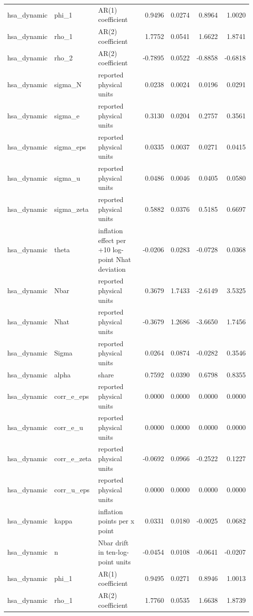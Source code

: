 \begin{tabular}{lllrrrr}
hsa\_dynamic & phi\_1 & AR(1) coefficient & 0.9496 & 0.0274 & 0.8964 & 1.0020 \\
hsa\_dynamic & rho\_1 & AR(2) coefficient & 1.7752 & 0.0541 & 1.6622 & 1.8741 \\
hsa\_dynamic & rho\_2 & AR(2) coefficient & -0.7895 & 0.0522 & -0.8858 & -0.6818 \\
hsa\_dynamic & sigma\_N & reported physical units & 0.0238 & 0.0024 & 0.0196 & 0.0291 \\
hsa\_dynamic & sigma\_e & reported physical units & 0.3130 & 0.0204 & 0.2757 & 0.3561 \\
hsa\_dynamic & sigma\_eps & reported physical units & 0.0335 & 0.0037 & 0.0271 & 0.0415 \\
hsa\_dynamic & sigma\_u & reported physical units & 0.0486 & 0.0046 & 0.0405 & 0.0580 \\
hsa\_dynamic & sigma\_zeta & reported physical units & 0.5882 & 0.0376 & 0.5185 & 0.6697 \\
hsa\_dynamic & theta & inflation effect per +10 log-point Nhat deviation & -0.0206 & 0.0283 & -0.0728 & 0.0368 \\
hsa\_dynamic & Nbar & reported physical units & 0.3679 & 1.7433 & -2.6149 & 3.5325 \\
hsa\_dynamic & Nhat & reported physical units & -0.3679 & 1.2686 & -3.6650 & 1.7456 \\
hsa\_dynamic & Sigma & reported physical units & 0.0264 & 0.0874 & -0.0282 & 0.3546 \\
hsa\_dynamic & alpha & share & 0.7592 & 0.0390 & 0.6798 & 0.8355 \\
hsa\_dynamic & corr\_e\_eps & reported physical units & 0.0000 & 0.0000 & 0.0000 & 0.0000 \\
hsa\_dynamic & corr\_e\_u & reported physical units & 0.0000 & 0.0000 & 0.0000 & 0.0000 \\
hsa\_dynamic & corr\_e\_zeta & reported physical units & -0.0692 & 0.0966 & -0.2522 & 0.1227 \\
hsa\_dynamic & corr\_u\_eps & reported physical units & 0.0000 & 0.0000 & 0.0000 & 0.0000 \\
hsa\_dynamic & kappa & inflation points per x point & 0.0331 & 0.0180 & -0.0025 & 0.0682 \\
hsa\_dynamic & n & Nbar drift in ten-log-point units & -0.0454 & 0.0108 & -0.0641 & -0.0207 \\
hsa\_dynamic & phi\_1 & AR(1) coefficient & 0.9495 & 0.0271 & 0.8946 & 1.0013 \\
hsa\_dynamic & rho\_1 & AR(2) coefficient & 1.7760 & 0.0535 & 1.6638 & 1.8739 \\

\end{tabular}
